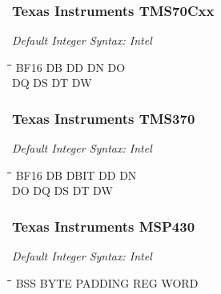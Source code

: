 \subsubsection{Texas Instruments TMS70Cxx}

{\em Default Integer Syntax: Intel}

{\tt\begin{tabbing}
\hspace{3cm}\=\hspace{3cm}\=\hspace{3cm}\=\hspace{3cm}\=\kill
BF16       \> DB          \> DD          \> DN          \> DO \\
DQ         \> DS          \> DT          \> DW \\
\end{tabbing}}

\subsubsection{Texas Instruments TMS370}

{\em Default Integer Syntax: Intel}

{\tt\begin{tabbing}
\hspace{3cm}\=\hspace{3cm}\=\hspace{3cm}\=\hspace{3cm}\=\kill
BF16       \> DB          \> DBIT        \> DD          \> DN \\
DO         \> DQ          \> DS          \> DT          \> DW \\
\end{tabbing}}

\subsubsection{Texas Instruments MSP430}

{\em Default Integer Syntax: Intel}

{\tt\begin{tabbing}
\hspace{3cm}\=\hspace{3cm}\=\hspace{3cm}\=\hspace{3cm}\=\kill
BSS        \> BYTE        \> PADDING     \> REG         \> WORD \\
\end{tabbing}}

